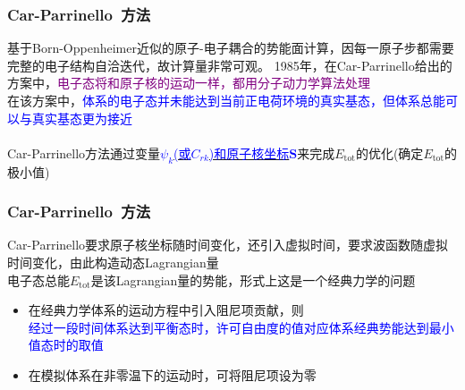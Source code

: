 {\frame
{
	\frametitle{\textrm{Car-Parrinello~}方法}
	基于\textrm{Born-Oppenheimer}近似的原子-电子耦合的势能面计算，因每一原子步都需要完整的电子结构自洽迭代，故计算量非常可观。
\vskip 5pt
\textrm{1985}年，在\textrm{Car-Parrinello}给出的方案中，\textcolor{purple}{电子态将和原子核的运动一样，都用分子动力学算法处理}\\
在该方案中，\textcolor{blue}{体系的电子态并未能达到当前正电荷环境的真实基态，但体系总能可以与真实基态更为接近}\\
{\fontsize{6.2pt}{5.2pt}}\\
\textrm{Car-Parrinello}方法通过变量\underline{\textcolor{blue}{$\psi_k$(或$C_{rk}$)和原子核坐标$\mathbf{S}$}}来完成$E_{\mathrm{tot}}$的优化(确定$E_{\mathrm{tot}}$的极小值)
}

\frame
{
	\frametitle{\textrm{Car-Parrinello~}方法}
	{\fontsize{6.2pt}{5.2pt}}
	\vskip 5pt
	\textrm{Car-Parrinello}要求原子核坐标随时间变化，还引入虚拟时间，要求波函数随虚拟时间变化，由此构造动态\textrm{Lagrangian}量\\
	{\fontsize{6.2pt}{5.2pt}}
	电子态总能$E_{\mathrm{tot}}$是该\textrm{Lagrangian}量的势能，形式上这是一个经典力学的问题
	\begin{itemize}
		\item 在经典力学体系的运动方程中引入阻尼项贡献，则\\
			\textcolor{blue}{经过一段时间体系达到平衡态时，许可自由度的值对应体系经典势能达到最小值态时的取值}
		\item 在模拟体系在非零温下的运动时，可将阻尼项设为零
	\end{itemize}
}

}
